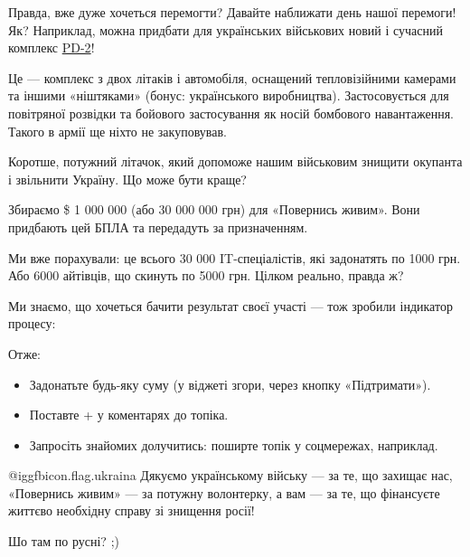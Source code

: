  
 
 
 
 

Правда, вже дуже хочеться перемогти? Давайте наближати день нашої перемоги! Як?
Наприклад, можна придбати для українських військових новий і сучасний комплекс
\href{https://uk.wikipedia.org/wiki/PD-2}{PD-2}!

Це — комплекс з двох літаків і автомобіля, оснащений тепловізійними камерами та
іншими «ніштяками» (бонус: українського виробництва). Застосовується для
повітряної розвідки та бойового застосування як носій бомбового навантаження.
Такого в армії ще ніхто не закуповував.

Коротше, потужний літачок, який допоможе нашим військовим знищити окупанта і
звільнити Україну. Що може бути краще?

Збираємо \$ 1 000 000 (або 30 000 000 грн) для «Повернись живим». Вони
придбають цей БПЛА та передадуть за призначенням.

Ми вже порахували: це всього 30 000 IT-спеціалістів, які задонатять по 1000
грн. Або 6000 айтівців, що скинуть по 5000 грн. Цілком реально, правда ж?

Ми знаємо, що хочеться бачити результат своєї участі — тож зробили індикатор
процесу:


Отже:

\begin{itemize}
  \item Задонатьте будь-яку суму (у віджеті згори, через кнопку «Підтримати»).
  \item Поставте + у коментарях до топіка.
  \item Запросіть знайомих долучитись: поширте топік у соцмережах, наприклад.
\end{itemize}

@igg{fbicon.flag.ukraina} Дякуємо українському війську — за те, що захищає нас,
«Повернись живим» — за потужну волонтерку, а вам — за те, що фінансуєте життєво
необхідну справу зі знищення росії!


Шо там по русні? ;)

